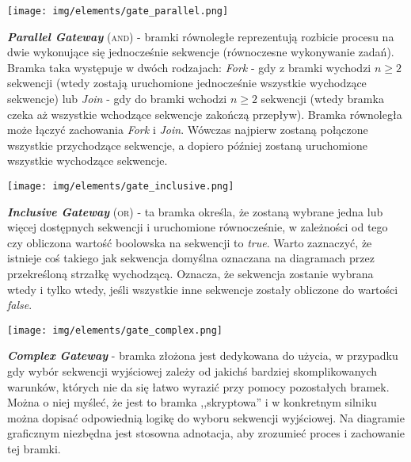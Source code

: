 \documentclass[declaration,shortabstract,mgr]{iithesis}
\begin{document}
\noindent\begin{minipage}[t]{0.075\textwidth}\vspace{0pt}
\texttt{[image: img/elements/gate\_parallel.png]}
\end{minipage}\hfill
\begin{minipage}[t]{0.875\textwidth}\vspace{0pt}
\textbf{\textit{Parallel Gateway}} (\textsc{and}) - bramki równoległe reprezentują rozbicie procesu na dwie wykonujące się jednocześnie sekwencje (równoczesne wykonywanie zadań). Bramka taka występuje w dwóch rodzajach: \textit{Fork} - gdy z bramki wychodzi $n \geq 2$ sekwencji (wtedy zostają uruchomione jednocześnie wszystkie wychodzące sekwencje) lub \textit{Join} - gdy do bramki wchodzi $n \geq 2$ sekwencji (wtedy bramka czeka aż wszystkie wchodzące sekwencje zakończą przepływ). Bramka równoległa może łączyć zachowania \textit{Fork} i \textit{Join}. Wówczas najpierw zostaną połączone wszystkie przychodzące sekwencje, a dopiero później zostaną uruchomione wszystkie wychodzące sekwencje.
\end{minipage}

\vspace{\mypointsep}

\noindent\begin{minipage}[t]{0.075\textwidth}\vspace{0pt}
\texttt{[image: img/elements/gate\_inclusive.png]}
\end{minipage}\hfill
\begin{minipage}[t]{0.875\textwidth}\vspace{0pt}
\textbf{\textit{Inclusive Gateway}} (\textsc{or}) - ta bramka określa, że zostaną wybrane jedna lub więcej dostępnych sekwencji i uruchomione równocześnie, w zależności od tego czy obliczona wartość boolowska na sekwencji to \textit{true}. Warto zaznaczyć, że istnieje coś takiego jak sekwencja domyślna oznaczana na diagramach przez przekreśloną strzałkę wychodzącą. Oznacza, że sekwencja zostanie wybrana wtedy i tylko wtedy, jeśli wszystkie inne sekwencje zostały obliczone do wartości \textit{false}.
\end{minipage}

\vspace{\mypointsep}

\noindent\begin{minipage}[t]{0.075\textwidth}\vspace{0pt}
\texttt{[image: img/elements/gate\_complex.png]}
\end{minipage}\hfill
\begin{minipage}[t]{0.875\textwidth}\vspace{0pt}
\textbf{\textit{Complex Gateway}} - bramka złożona jest dedykowana do użycia, w przypadku gdy wybór sekwencji wyjściowej zależy od jakichś bardziej skomplikowanych warunków, których nie da się łatwo wyrazić przy pomocy pozostałych bramek. Można o niej myśleć, że jest to bramka ,,skryptowa'' i w konkretnym silniku można dopisać odpowiednią logikę do wyboru sekwencji wyjściowej. Na diagramie graficznym niezbędna jest stosowna adnotacja, aby zrozumieć proces i zachowanie tej bramki.
\end{minipage}
\end{document}
